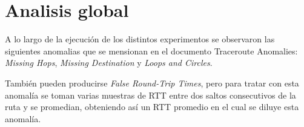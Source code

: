 \section{Analisis global}
A lo largo de la ejecución de los distintos experimentos se observaron las siguientes anomalias que se mensionan en el documento Traceroute Anomalies:
\emph{Missing Hops}, \emph{Missing Destination} y \emph{Loops and Circles}.

También pueden producirse \emph{False Round-Trip Times}, pero para tratar con esta anomalía se toman varias muestras de RTT entre dos saltos consecutivos de la ruta y se promedian, obteniendo así un RTT promedio en el cual se diluye esta anomalía.


